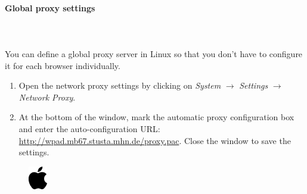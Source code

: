 \documentclass[a4paper,12pt]{scrartcl}
\begin{document}
\paragraph*{Global proxy settings} ~\\
\\
You can define a global proxy server in Linux so that you don't have to configure it for each browser individually.
\begin{enumerate}
	\item Open the network proxy settings by clicking on \emph{System} $\rightarrow$ \emph{Settings} $\rightarrow$ \emph{Network Proxy}.
    \item At the bottom of the window, mark the automatic proxy configuration box and enter the auto-configuration URL: \url{http://wpad.mb67.stusta.mhn.de/proxy.pac}. Close the window to save the settings.
\end{enumerate}



\newpage
\enlargethispage{20pt}

\begin{figure}[t!]
    \raggedleft
    \vspace{-20pt}
    \includegraphics[height=1cm,keepaspectratio]{Bilder/apple_logo_neu}
    \vspace{-20pt}
\end{figure}
\end{document}
